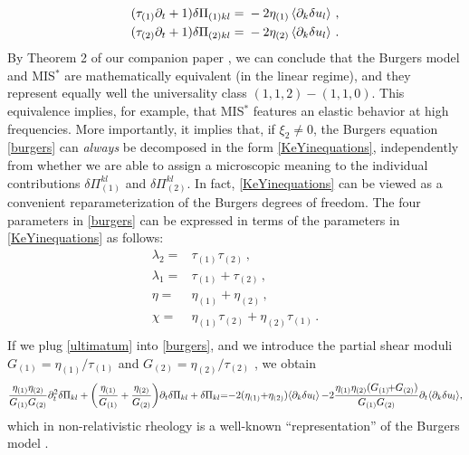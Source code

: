\documentclass[a4paper, amsfonts, amssymb, amsmath, reprint, showkeys, nofootinbib, twoside, onecolumn,notitlepage]{revtex4-1}
\begin{document}
\begin{equation}\label{KeYinequations}
\begin{split}
(\tau_{(1)}\partial_t + 1)\delta \Pi_{(1)kl} ={}& -2\eta_{(1)} \braket{\partial_k \delta u_l} \, , \\
(\tau_{(2)}\partial_t + 1)\delta \Pi_{(2)kl} ={}& -2\eta_{(2)} \braket{\partial_k \delta u_l} \, .\\
\end{split}
\end{equation}
By Theorem 2 of our companion paper \cite{paperI}, we can conclude that the Burgers model and MIS$^*$ are mathematically equivalent (in the linear regime), and they represent equally well the universality class $(1,1,2)-(1,1,0)$. This equivalence implies, for example, that MIS$^*$ features an elastic behavior at high frequencies. More importantly, it implies that, if $\xi_2 \neq 0$, the Burgers equation \eqref{burgers} can \textit{always} be decomposed in the form \eqref{KeYinequations}, independently from whether we are able to assign a microscopic meaning to the individual contributions $\delta \Pi_{(1)}^{kl}$ and $\delta \Pi^{kl}_{(2)}$. In fact,  \eqref{KeYinequations} can be viewed as a convenient reparameterization of the Burgers degrees of freedom. The four parameters in \eqref{burgers} can be expressed in terms of the parameters in \eqref{KeYinequations} as follows:
\begin{equation}\label{ultimatum}
\begin{split}
\lambda_2 ={}& \tau_{(1)}\tau_{(2)}  \, ,\\
\lambda_1 ={}& \tau_{(1)}+\tau_{(2)} \, ,  \\
\eta ={}& \eta_{(1)}+\eta_{(2)} \, ,  \\
\chi ={}& \eta_{(1)} \tau_{(2)}+\eta_{(2)}\tau_{(1)} \, . \\
\end{split}
\end{equation}
If we plug \eqref{ultimatum} into \eqref{burgers}, and we introduce the partial shear moduli $G_{(1)}=\eta_{(1)}/\tau_{(1)}$ and $G_{(2)}=\eta_{(2)}/\tau_{(2)}$ \cite{BaggioliHolography}, we obtain
\begin{equation}
\dfrac{\eta_{(1)}\eta_{(2)}}{G_{(1)}G_{(2)}} \partial_t^2 \delta \Pi_{kl} + \bigg(\dfrac{\eta_{(1)}}{G_{(1)}} +\dfrac{\eta_{(2)}}{G_{(2)}} \bigg) \partial_t \delta \Pi_{kl} + \delta \Pi_{kl}  {=} {-} 2(\eta_{(1)}{+}\eta_{(2)}) \! \braket{\partial_k \delta u_l} {-}2 \dfrac{\eta_{(1)}\eta_{(2)} (G_{(1)}\!{+}G_{(2)})}{G_{(1)}G_{(2)}} \partial_t \! \braket{\partial_k \delta u_l} \! ,
\end{equation}
which in non-relativistic rheology is a well-known  ``representation'' of the Burgers model \cite{Malek2018}.
\end{document}
